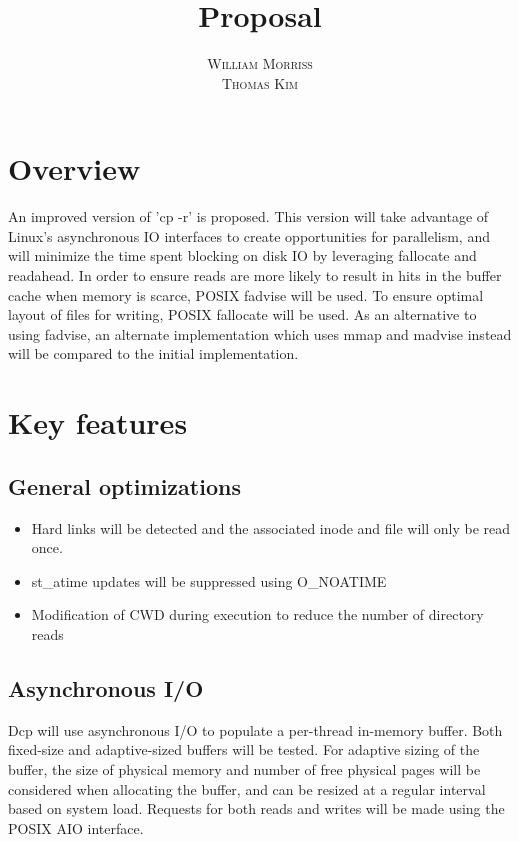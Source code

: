 \documentclass[12pt]{article}
\title{\vspace{-25mm}\fontsize{16pt}{10pt}\selectfont\textbf{Proposal}} %
\author{
  \textsc{William Morriss} \\
  \textsc{Thomas Kim}
}
\date{}
\begin{document}
\maketitle %

\section{Overview}
An improved version of 'cp -r' is proposed.
This version will take advantage of Linux's asynchronous IO interfaces to create
opportunities for parallelism, and will minimize the time spent blocking on disk
IO by leveraging fallocate and readahead. In order to ensure reads
are more likely to result in hits in the buffer cache when memory is scarce, POSIX
fadvise will be used. To ensure optimal layout of files for writing, POSIX
fallocate will be used. As an alternative to using fadvise, an alternate
implementation which uses mmap and madvise instead will be compared to the initial implementation.

\section{Key features}
\subsection{General optimizations}
\begin{itemize}
    \item Hard links will be detected and the associated inode and file will
          only be read once.
    \item st\_atime updates will be suppressed using O\_NOATIME
    \item Modification of CWD during execution to reduce the number
          of directory reads
\end{itemize}
\subsection{Asynchronous I/O}
Dcp will use asynchronous I/O to populate a per-thread in-memory buffer.
Both fixed-size and adaptive-sized buffers will be tested.
For adaptive sizing of the buffer, the size of physical memory
and number of free physical pages will be considered when allocating
the buffer, and can be resized at a regular interval based on system load.
Requests for both reads and writes will be made using the POSIX AIO interface.
\end{document}
